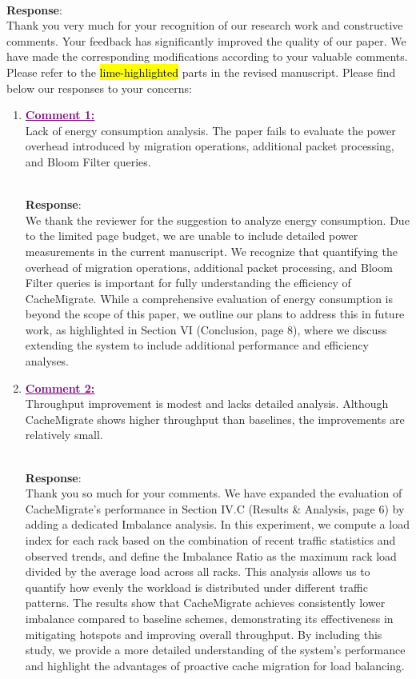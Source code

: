 \documentclass[11pt]{article}
\newcounter{reviewer}
\newenvironment{reply}
   {\medskip \noindent \color{blue} \begin{sf}\\ \textbf{Response}:\\  }
   {\medskip \par \end{sf}}
\newcommand{\comment}[1]{\textcolor{purple}{\textbf{\underline{Comment #1:}}}\\}
\DeclareRobustCommand{\thanksfor}[1]{Thank you so much for #1}
\DeclareRobustCommand{\hlAdmin}[1]{{\sethlcolor{lime}\hl{#1}}}%
\begin{document}
\begin{reply}
    Thank you very much for your recognition of our research work and constructive comments. Your feedback has significantly improved the quality of our paper. We have made the corresponding modifications according to your valuable comments. Please refer to the \hlAdmin{lime-highlighted} parts in the revised manuscript. Please find below our responses to your concerns:
\end{reply}

\begin{enumerate}
    \item \comment{1} Lack of energy consumption analysis. The paper fails to evaluate the power overhead introduced by migration operations, additional packet processing, and Bloom Filter queries.
          \begin{reply}
              We thank the reviewer for the suggestion to analyze energy consumption. Due to the limited page budget, we are unable to include detailed power measurements in the current manuscript. We recognize that quantifying the overhead of migration operations, additional packet processing, and Bloom Filter queries is important for fully understanding the efficiency of CacheMigrate. While a comprehensive evaluation of energy consumption is beyond the scope of this paper, we outline our plans to address this in future work, as highlighted in Section VI (Conclusion, page 8), where we discuss extending the system to include additional performance and efficiency analyses.

          \end{reply}

    \item \comment{2} Throughput improvement is modest and lacks detailed analysis. Although CacheMigrate shows higher throughput than baselines, the improvements are relatively small.
          \begin{reply}
              \thanksfor{your comments}. We have expanded the evaluation of CacheMigrate's performance in Section IV.C (Results \& Analysis, page 6) by adding a dedicated Imbalance analysis. In this experiment, we compute a load index for each rack based on the combination of recent traffic statistics and observed trends, and define the Imbalance Ratio as the maximum rack load divided by the average load across all racks. This analysis allows us to quantify how evenly the workload is distributed under different traffic patterns. The results show that CacheMigrate achieves consistently lower imbalance compared to baseline schemes, demonstrating its effectiveness in mitigating hotspots and improving overall throughput. By including this study, we provide a more detailed understanding of the system's performance and highlight the advantages of proactive cache migration for load balancing.
          \end{reply}


\end{enumerate}
\end{document}
